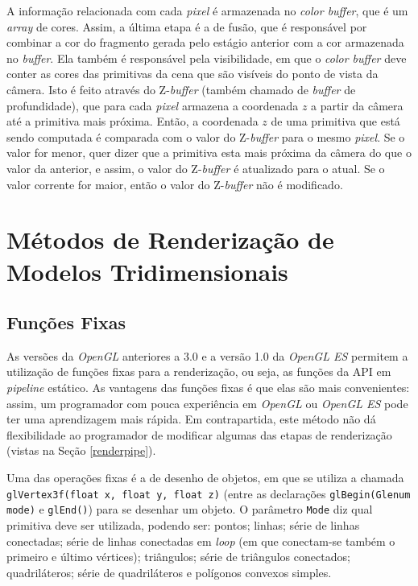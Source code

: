 	 A informação relacionada com cada \textit{pixel} é armazenada no \textit{color buffer}, que é um \textit{array} de cores. Assim, a última etapa é a de fusão, que é responsável por combinar a cor do fragmento gerada pelo estágio anterior com a cor armazenada no \textit{buffer}. Ela também é responsável pela visibilidade, em que o \textit{color buffer} deve conter as cores das primitivas da cena que são visíveis do ponto de vista da câmera. Isto é feito através do Z-\textit{buffer} (também chamado de \textit{buffer} de profundidade), que para cada \textit{pixel} armazena a coordenada $z$ a partir da câmera até a primitiva mais próxima.  Então, a coordenada $z$ de uma primitiva que está sendo computada é comparada com  o valor do Z-\textit{buffer} para o mesmo \textit{pixel}. Se o valor for menor, quer dizer que a primitiva esta mais próxima da câmera do que o valor da anterior, e assim, o valor do Z-\textit{buffer} é atualizado para o atual. Se o valor corrente for maior, então o valor do Z-\textit{buffer} não é modificado. 

\section{Métodos de Renderização de Modelos Tridimensionais}

\subsection{Funções Fixas}

	As versões da \textit{OpenGL} anteriores a 3.0  e a versão 1.0 da \textit{OpenGL ES} permitem a utilização de funções fixas para a renderização, ou seja, as funções da API em \textit{pipeline} estático. As vantagens das funções fixas é que elas são mais convenientes: assim, um programador com pouca experiência em  \textit{OpenGL} ou \textit{OpenGL ES} pode ter uma aprendizagem mais rápida. Em contrapartida, este método não dá flexibilidade ao programador de modificar algumas das etapas de renderização (vistas na Seção \ref{renderpipe}). 

	 Uma das operações fixas é a de desenho de objetos, em que se utiliza a chamada \texttt{glVertex3f(float x, float y, float z)} (entre as declarações \texttt{glBegin(Glenum mode)} e \texttt{glEnd()}) para se desenhar um objeto. O parâmetro \texttt{Mode} diz qual primitiva deve ser utilizada, podendo ser: pontos; linhas; série de linhas conectadas; série de linhas conectadas em \textit{loop} (em que conectam-se também o primeiro e último vértices); triângulos; série de triângulos conectados; quadriláteros; série de quadriláteros e polígonos convexos simples. 

